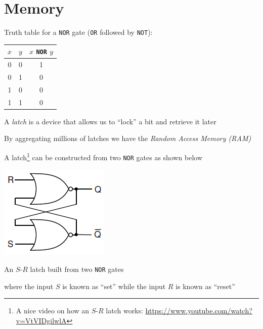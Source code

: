 \documentclass[8pt,a4paper,compress]{beamer}
\begin{document}
\section{Memory}
\begin{frame}[fragile]
Truth table for a \lstinline{NOR} gate (\lstinline{OR} followed by \lstinline{NOT}):
\begin{center}
\begin{tabular}{cc|c}
$x$ & $y$ & $x$ \lstinline$NOR$ $y$ \\ \hline
0 & 0 & 1 \\
0 & 1 & 0 \\
1 & 0 & 0 \\
1 & 1 & 0
\end{tabular}
\end{center}

\bigskip

A \emph{latch} is a device that allows us to ``lock'' a bit and retrieve it later

\bigskip

By aggregating millions of latches we have the \emph{Random Access Memory (RAM)}

\bigskip

A latch\footnote{A nice video on how an $S$-$R$ latch works: \href{https://www.youtube.com/watch?v=VtVIDgilwlA}{https://www.youtube.com/watch?v=VtVIDgilwlA}} can be constructed from two \lstinline{NOR} gates as shown below
\begin{center}
\includegraphics[scale=0.4]{figures/latch.png}

\smallskip

\tiny An $S$-$R$ latch built from two \lstinline{NOR} gates
\end{center}
where the input $S$ is known as ``set'' while the input $R$ is known as ``reset''
\end{frame}
\end{document}
